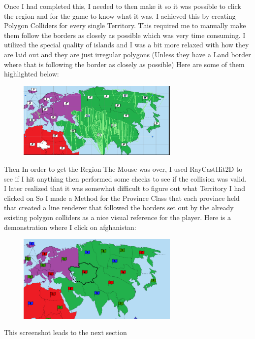 \documentclass{article}
\begin{document}
	Once I had completed this, I needed to then make it so it was possible to click the region and for the game to know what it was. I achieved this by creating Polygon Colliders for every single Territory. This required me to manually make them follow the borders as closely as possible which was very time consuming. I utilized the special quality of islands and I was a bit more relaxed with how they are laid out and they are just irregular polygons (Unless they have a Land border where that is following the border as closely as possible) Here are some of them highlighted below:
	\begin{figure}[h!]
		\centering
		\includegraphics[width=0.7\textwidth]{colliders.png}
	\end{figure}
	Then In order to get the Region The Mouse was over, I used RayCastHit2D to see if I hit anything then performed some checks to see if the collision was valid.\\ I later realized that it was somewhat difficult to figure out what Territory I had clicked on So I made a Method for the Province Class that each province held that created a line renderer that followed the borders set out by the already existing polygon colliders as a nice visual reference for the player. Here is a demonstration where I click on afghanistan:
	\begin{figure}[h!]
		\centering
		\includegraphics[width=0.7\textwidth]{linerendererdemo.png}
	\end{figure}
	This screenshot leads to the next section
	\newpage
\end{document}
